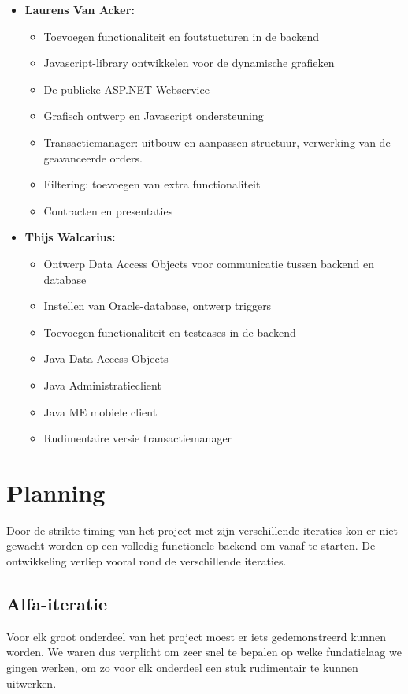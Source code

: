 \begin{itemize}
	\item \textbf{Laurens Van Acker: }
	\begin{itemize}
 	\item Toevoegen functionaliteit en foutstucturen in de backend
	\item Javascript-library ontwikkelen voor de dynamische grafieken
	\item De publieke ASP.NET Webservice
	\item Grafisch ontwerp en Javascript ondersteuning
	\item Transactiemanager: uitbouw en aanpassen structuur, verwerking van de geavanceerde orders.
 	\item Filtering: toevoegen van extra functionaliteit
	\item Contracten en presentaties
	 \end{itemize}
	 
	 \item \textbf{Thijs Walcarius: }
	 \begin{itemize}
	 	\item Ontwerp Data Access Objects voor communicatie tussen backend en database
	 	\item Instellen van Oracle-database, ontwerp triggers
		\item Toevoegen functionaliteit en testcases in de backend
	 	\item Java Data Access Objects
	 	\item Java Administratieclient
	 	\item Java ME mobiele client
	 	\item Rudimentaire versie transactiemanager
	 \end{itemize}
\end{itemize}


\section{Planning}

Door de strikte timing van het project met zijn verschillende iteraties kon er niet gewacht worden op een volledig functionele backend om vanaf te starten. De ontwikkeling verliep vooral rond de verschillende iteraties.

\subsection{Alfa-iteratie}
Voor elk groot onderdeel van het project moest er iets gedemonstreerd kunnen worden. We waren dus verplicht om zeer snel te bepalen op welke fundatielaag we gingen werken, om zo voor elk onderdeel een stuk rudimentair te kunnen uitwerken.

